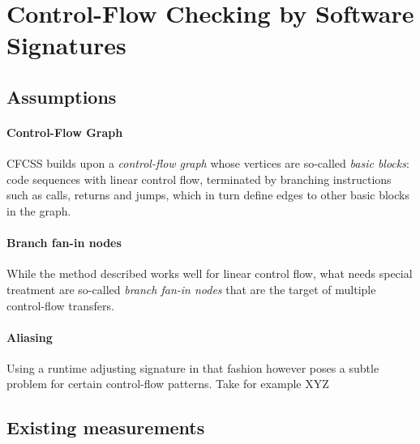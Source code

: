 \section{Control-Flow Checking by Software Signatures}


\subsection{Assumptions}



\paragraph{Control-Flow Graph}

CFCSS builds upon a \emph{control-flow graph} whose vertices are so-called
\emph{basic blocks}: code sequences with linear control flow, terminated by
branching instructions such as calls, returns and jumps, which in turn define
edges to other basic blocks in the graph.


\paragraph{Branch fan-in nodes}

While the method described works well for linear control flow, what needs
special treatment are so-called \emph{branch fan-in nodes} that are the target
of multiple control-flow transfers.


\paragraph{Aliasing}

Using a runtime adjusting signature in that fashion however poses a subtle
problem for certain control-flow patterns. Take for example XYZ


\subsection{Existing measurements}

